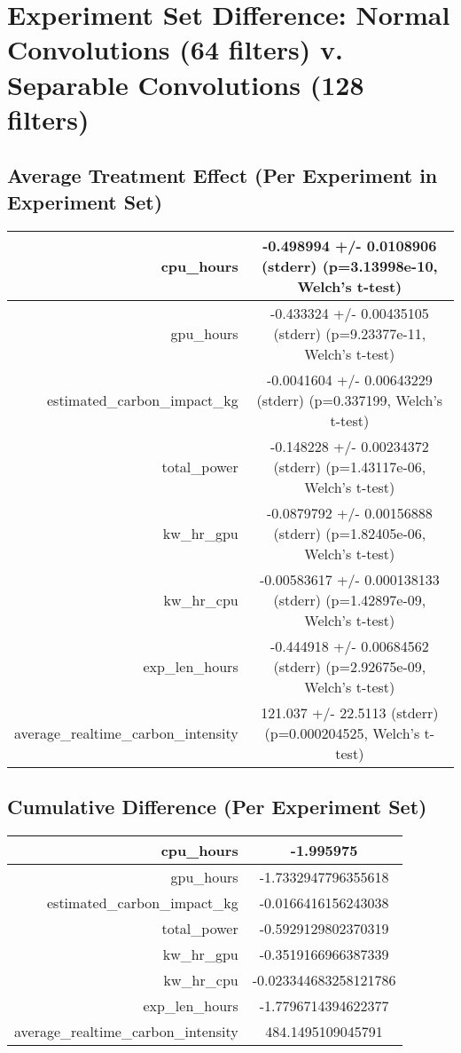 \documentclass{article}%
\begin{document}
%
\normalsize%
\section{Experiment Set Difference: Normal Convolutions (64 filters) v. Separable Convolutions (128 filters)}%
\label{sec:Experiment Set Difference Normal Convolutions (64 filters) v. Separable Convolutions (128 filters)}%
\subsection{Average Treatment Effect (Per Experiment in Experiment Set)}%
\label{subsec:Average Treatment Effect (Per Experiment in Experiment Set)}%
\begin{tabular}{|r|c|}%
\hline%
cpu\_hours&{-}0.498994 +/{-} 0.0108906 (stderr) (p=3.13998e{-}10, Welch's t{-}test)\\%
\hline%
gpu\_hours&{-}0.433324 +/{-} 0.00435105 (stderr) (p=9.23377e{-}11, Welch's t{-}test)\\%
\hline%
estimated\_carbon\_impact\_kg&{-}0.0041604 +/{-} 0.00643229 (stderr) (p=0.337199, Welch's t{-}test)\\%
\hline%
total\_power&{-}0.148228 +/{-} 0.00234372 (stderr) (p=1.43117e{-}06, Welch's t{-}test)\\%
\hline%
kw\_hr\_gpu&{-}0.0879792 +/{-} 0.00156888 (stderr) (p=1.82405e{-}06, Welch's t{-}test)\\%
\hline%
kw\_hr\_cpu&{-}0.00583617 +/{-} 0.000138133 (stderr) (p=1.42897e{-}09, Welch's t{-}test)\\%
\hline%
exp\_len\_hours&{-}0.444918 +/{-} 0.00684562 (stderr) (p=2.92675e{-}09, Welch's t{-}test)\\%
\hline%
average\_realtime\_carbon\_intensity&121.037 +/{-} 22.5113 (stderr) (p=0.000204525, Welch's t{-}test)\\%
\hline%
\end{tabular}

%
\subsection{Cumulative Difference (Per Experiment Set)}%
\label{subsec:Cumulative Difference (Per Experiment Set)}%
\begin{tabular}{|r|c|}%
\hline%
cpu\_hours&{-}1.995975\\%
\hline%
gpu\_hours&{-}1.7332947796355618\\%
\hline%
estimated\_carbon\_impact\_kg&{-}0.0166416156243038\\%
\hline%
total\_power&{-}0.5929129802370319\\%
\hline%
kw\_hr\_gpu&{-}0.3519166966387339\\%
\hline%
kw\_hr\_cpu&{-}0.023344683258121786\\%
\hline%
exp\_len\_hours&{-}1.7796714394622377\\%
\hline%
average\_realtime\_carbon\_intensity&484.1495109045791\\%
\hline%
\end{tabular}

%
\end{document}
